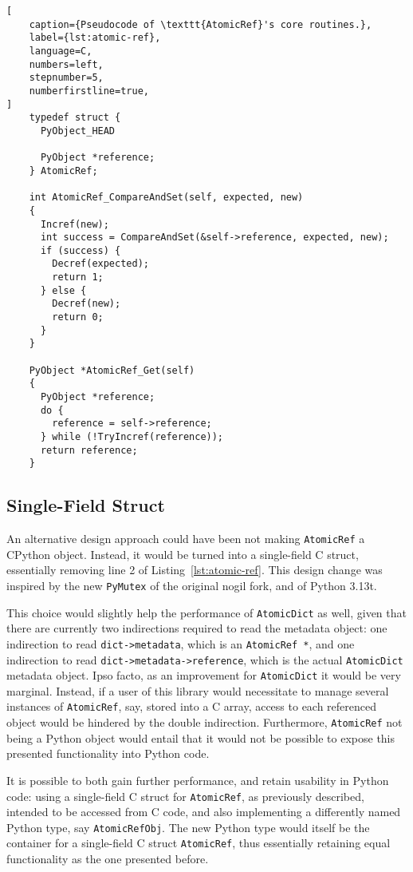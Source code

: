\begin{lstlisting}[
    caption={Pseudocode of \texttt{AtomicRef}'s core routines.},
    label={lst:atomic-ref},
    language=C,
    numbers=left,
    stepnumber=5,
    numberfirstline=true,
]
    typedef struct {
      PyObject_HEAD

      PyObject *reference;
    } AtomicRef;

    int AtomicRef_CompareAndSet(self, expected, new)
    {
      Incref(new);
      int success = CompareAndSet(&self->reference, expected, new);
      if (success) {
        Decref(expected);
        return 1;
      } else {
        Decref(new);
        return 0;
      }
    }

    PyObject *AtomicRef_Get(self)
    {
      PyObject *reference;
      do {
        reference = self->reference;
      } while (!TryIncref(reference));
      return reference;
    }
\end{lstlisting}

\subsection{Single-Field Struct}\label{subsec:single-field-struct}

An alternative design approach could have been not making \texttt{AtomicRef} a CPy\-thon object.
Instead, it would be turned into a single-field C struct, essentially removing line 2 of Listing~\ref{lst:atomic-ref}.
This design change was inspired by the new \texttt{PyMutex} of the original nogil fork, and of Python 3.13t.

This choice would slightly help the performance of \texttt{AtomicDict} as well, given that there are currently two indirections required to read the metadata object: one indirection to read \texttt{{dict->metadata}}, which is an \texttt{AtomicRef *}, and one indirection to read \texttt{{dict->metadata->reference}}, which is the actual \texttt{AtomicDict} metadata object.
Ipso facto, as an improvement for \texttt{AtomicDict} it would be very marginal.
Instead, if a user of this library would necessitate to manage several instances of \texttt{AtomicRef}, say, stored into a C array, access to each referenced object would be hindered by the double indirection.
Furthermore, \texttt{AtomicRef} not being a Python object would entail that it would not be possible to expose this presented functionality into Python code.

It is possible to both gain further performance, and retain usability in Python code: using a single-field C struct for \texttt{AtomicRef}, as previously described, intended to be accessed from C code, and also implementing a differently named Python type, say \texttt{AtomicRefObj}.
The new Python type would itself be the container for a single-field C struct \texttt{AtomicRef}, thus essentially retaining equal functionality as the one presented before.


